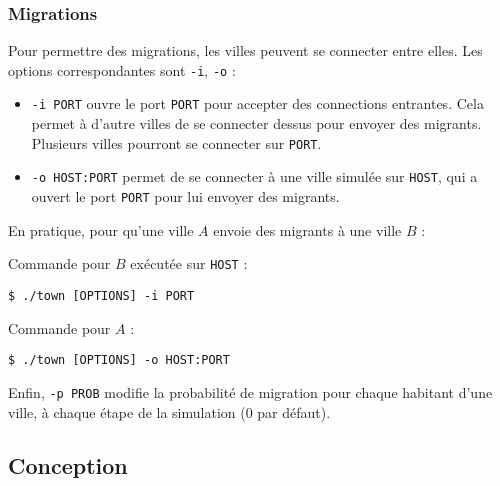 \documentclass[draft,10pt]{article}
\begin{document}
\subsubsection{Migrations}
Pour permettre des migrations, les villes peuvent se connecter entre elles.
Les options correspondantes sont \verb|-i|, \verb|-o| :
\begin{itemize}
\item \verb|-i PORT| ouvre le port \verb|PORT| pour accepter des connections entrantes. 
      Cela permet à d'autre villes de se connecter dessus pour envoyer des migrants.
      Plusieurs villes pourront se connecter sur \verb|PORT|.
\item \verb|-o HOST:PORT| permet de se connecter à une ville simulée sur \verb|HOST|, qui
      a ouvert le port \verb|PORT| pour lui envoyer des migrants.
\end{itemize}

En pratique, pour qu'une ville $A$ envoie des migrants à une ville $B$ :

Commande pour $B$ exécutée sur \verb|HOST| :
\begin{verbatim}
$ ./town [OPTIONS] -i PORT
\end{verbatim}

Commande pour $A$ :
\begin{verbatim}
$ ./town [OPTIONS] -o HOST:PORT
\end{verbatim}

Enfin, \verb|-p PROB| modifie la probabilité de migration pour chaque habitant d'une ville,
à chaque étape de la simulation (0 par défaut).


\subsection{Conception}
\end{document}

